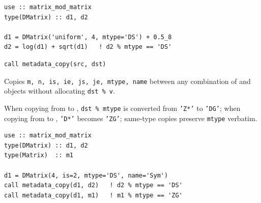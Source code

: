 \lstset{language=[95]Fortran}
\begin{lstlisting}
use :: matrix_mod_matrix
type(DMatrix) :: d1, d2

d1 = DMatrix('uniform', 4, mtype='DS') + 0.5_8
d2 = log(d1) + sqrt(d1)   ! d2 % mtype == 'DS'
\end{lstlisting}



\lstset{language=[95]Fortran}
\begin{lstlisting}
call metadata_copy(src, dst)
\end{lstlisting}

Copies \texttt{m, n, is, ie, js, je, mtype, name} between any combination of  and  objects without allocating \texttt{dst \% v}.

When copying from  to , \texttt{dst \% mtype} is converted from \texttt{'Z*'} to \texttt{'DG'}; when copying from  to , \texttt{'D*'} becomes \texttt{'ZG'}; same-type copies preserve \texttt{mtype} verbatim.

\begin{description}[leftmargin=2.2cm, style=nextline]
\end{description}

\lstset{language=[95]Fortran}
\begin{lstlisting}
use :: matrix_mod_matrix
type(DMatrix) :: d1, d2
type(Matrix)  :: m1

d1 = DMatrix(4, is=2, mtype='DS', name='Sym')
call metadata_copy(d1, d2)   ! d2 % mtype == 'DS'
call metadata_copy(d1, m1)   ! m1 % mtype == 'ZG'
\end{lstlisting}



